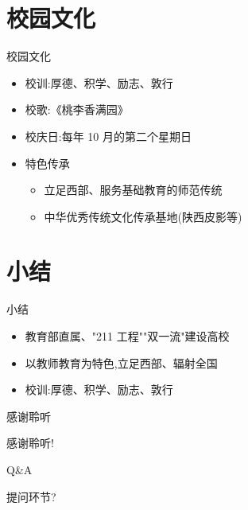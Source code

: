 \documentclass{beamer}
\begin{document}
\section{校园文化}
\begin{frame}{校园文化}
  \begin{itemize}
    \item 校训:厚德、积学、励志、敦行
    \item 校歌:《桃李香满园》
    \item 校庆日:每年 10 月的第二个星期日
    \item 特色传承
    \begin{itemize}
      \item 立足西部、服务基础教育的师范传统
      \item 中华优秀传统文化传承基地(陕西皮影等)
    \end{itemize}
  \end{itemize}
\end{frame}

\section{小结}
\begin{frame}{小结}
  \begin{itemize}
    \item 教育部直属、"211 工程""双一流"建设高校
    \item 以教师教育为特色,立足西部、辐射全国
    \item 校训:厚德、积学、励志、敦行
  \end{itemize}
\end{frame}

\begin{frame}{感谢聆听}
  \begin{center}
    \Huge 感谢聆听!
  \end{center}
\end{frame}

\begin{frame}{Q\&A}
  \begin{center}
    \Huge 提问环节?
  \end{center}
\end{frame}

\end{document}
